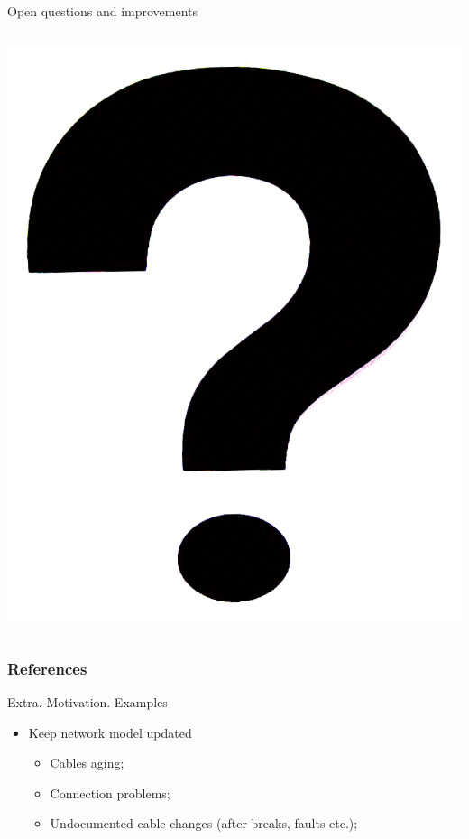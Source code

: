 \documentclass[../main.tex]{subfiles}
\begin{document}
\begin{frame}[fragile]{Open questions and improvements}
\begin{columns}[c]
\begin{column}{0.2\linewidth}
\centering
\includegraphics[scale=0.1]{pics/question_mark.png}
\end{column}
\end{columns}

\end{frame}


\begin{frame}[t, allowframebreaks]
\frametitle{References}


\end{frame}

\backupbegin

\begin{frame}[t]
\end{frame}

\begin{frame}[t]{Extra. Motivation. Examples}
\begin{itemize}
\item Keep network model updated
\begin{itemize}
\item Cables aging;
\item Connection problems;
\item Undocumented cable changes (after breaks, faults etc.);
\end{itemize}
\end{itemize}
\end{frame}
\end{document}
